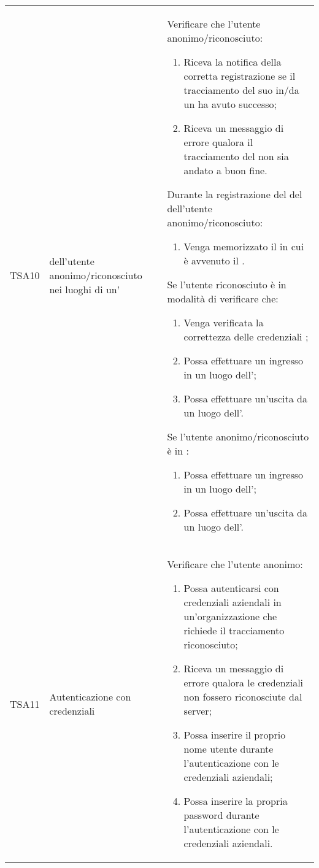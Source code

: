 {\begin{longtable}{ c  C{3cm}  C{11cm} }
TSA10 &  dell'utente anonimo/riconosciuto nei luoghi di un' &
Verificare che l'utente anonimo/riconosciuto:
\begin{enumerate}
    \item Riceva la notifica della corretta registrazione se il tracciamento del suo  in/da un  ha avuto successo;
    \item Riceva un messaggio di errore qualora il tracciamento del  non sia andato a buon fine.
\end{enumerate}
Durante la registrazione del  del  dell'utente anonimo/riconosciuto:
\begin{enumerate}[resume]
    \item Venga memorizzato il  in cui è avvenuto il .
\end{enumerate}
Se l'utente riconosciuto è in modalità di  verificare che:
\begin{enumerate}[resume]
    \item Venga verificata la correttezza delle credenziali ;
    \item Possa effettuare un ingresso in un luogo dell';
    \item Possa effettuare un'uscita da un luogo dell'.
\end{enumerate}
Se l'utente anonimo/riconosciuto è in :
\begin{enumerate}[resume]
    \item Possa effettuare un ingresso in un luogo dell';
    \item Possa effettuare un'uscita da un luogo dell'.
\end{enumerate} \\

TSA11 & Autenticazione con credenziali  &
Verificare che l'utente anonimo:
\begin{enumerate}
    \item Possa autenticarsi con credenziali aziendali in un'organizzazione che richiede il tracciamento riconosciuto;
    \item Riceva un messaggio di errore qualora le credenziali  non fossero riconosciute dal server;
    \item Possa inserire il proprio nome utente durante l'autenticazione con le credenziali  aziendali;
    \item Possa inserire la propria password durante l'autenticazione con le credenziali  aziendali.
\end{enumerate} \\


\end{longtable}}
